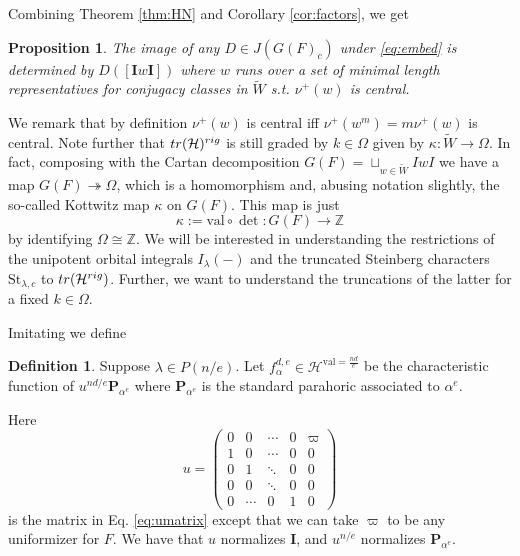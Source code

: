 \documentclass{amsart}
\numberwithin{equation}{section}
\newtheorem{proposition}[lemma]{Proposition}%
\theoremstyle{definition}
\newtheorem{definition}[lemma]{Definition}%
\def\tr{{\rm tr}}
\def\val{\mathrm{val}}
\def\tilde{\widetilde}
\newcommand{\cH}{\mathcal{H}}
\newcommand{\bP}{\mathbf{P}}
\newcommand{\bI}{\mathbf{I}}
\newcommand{\Z}{{\mathbb Z}}
\newcommand{\St}{\mathrm{St}}
\begin{document}
Combining Theorem \ref{thm:HN} and Corollary \ref{cor:factors}, we get
\begin{proposition}
\label{prop:uniquedual}
The image of any $D\in J(G(F)_c)$ under \eqref{eq:embed}
is determined by $D([\bI w\bI])$ where $w$ runs over a set of minimal length representatives for conjugacy classes in $\tilde{W}$ s.t. $\nu^+(w)$ is central.
\end{proposition}

We remark that by definition $\nu^+(w)$ is central iff $\nu^+(w^m)=m\nu^+(w)$ is central. Note further that $\tr(\cH)^{rig}$ is still graded by $k\in \Omega$ given by $\kappa:\tilde{W}\rightarrow\Omega$. In fact, composing with the Cartan decomposition $G(F)=\sqcup_{w\in\tilde{W}} IwI$ we have a map $G(F)\twoheadrightarrow\Omega$, which is a homomorphism and, abusing notation slightly, the so-called Kottwitz map $\kappa$ on $G(F)$. This map is just
$$\kappa:=\val \circ \det: G(F)\to \Z$$
by identifying $\Omega\cong\Z$. We will be interested in understanding the restrictions of the unipotent orbital integrals $I_\lambda(-)$ and the truncated Steinberg characters $\St_{\lambda,c}$ to $\tr(\cH^{rig})$. Further, we want to understand the truncations of the latter for a fixed $k\in \Omega$.

Imitating \cite[IV 1.]{W2} we define
\begin{definition}
\label{def:w2functions}
Suppose $\lambda\in P(n/e)$.
Let $f^{d,e}_\alpha\in\cH^{\val=\frac{nd}{e}}$ be the characteristic function
of $u^{nd/e}\bP_{\alpha^e}$ where $\bP_{\alpha^e}$ is the standard parahoric associated to $\alpha^e$.
\end{definition}

Here
$$u=\begin{pmatrix}
0 & 0 & \cdots & 0 & \varpi\\
1 & 0 & \cdots & 0 & 0\\
0 & 1 & \ddots & 0 & 0\\
0 & 0 & \ddots & 0 & 0\\
0 & \cdots & 0 & 1 & 0
\end{pmatrix}$$ is the matrix in Eq. \eqref{eq:umatrix} except that we can take $\varpi$ to be any uniformizer for $F$. We have that $u$ normalizes $\bI$, and $u^{n/e}$ normalizes $\bP_{\alpha^e}$.
\end{document}
